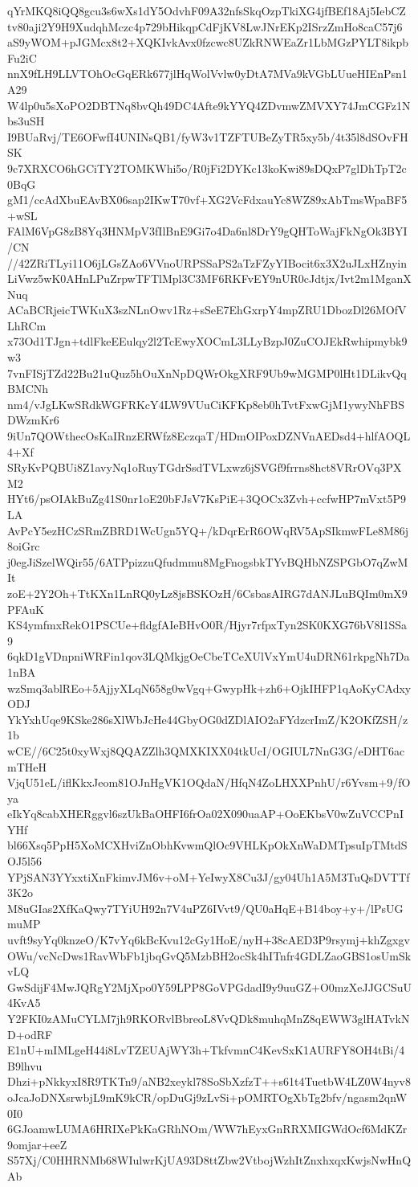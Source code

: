 qYrMKQ8iQQ8gcu3s6wXs1dY5OdvhF09A32nfsSkqOzpTkiXG4jfBEf18Aj5IebCZ
tv80aji2Y9H9XudqhMczc4p729bHikqpCdFjKV8LwJNrEKp2ISrzZmHo8caC57j6
aS9yWOM+pJGMcx8t2+XQKIvkAvx0fzcwc8UZkRNWEaZr1LbMGzPYLT8ikpbFu2iC
nnX9fLH9LLVTOhOcGqERk677jlHqWolVvlw0yDtA7MVa9kVGbLUueHIEnPsn1A29
W4lp0u5sXoPO2DBTNq8bvQh49DC4Afte9kYYQ4ZDvmwZMVXY74JmCGFz1Nbs3uSH
I9BUaRvj/TE6OFwfI4UNINsQB1/fyW3v1TZFTUBeZyTR5xy5b/4t35l8dSOvFHSK
9c7XRXCO6hGCiTY2TOMKWhi5o/R0jFi2DYKc13koKwi89sDQxP7glDhTpT2c0BqG
gM1/ccAdXbuEAvBX06sap2IKwT70vf+XG2VcFdxauYc8WZ89xAbTmsWpaBF5+wSL
FAlM6VpG8zB8Yq3HNMpV3fIlBnE9Gi7o4Da6nl8DrY9gQHToWajFkNgOk3BYI/CN
//42ZRiTLyi11O6jLGsZAo6VVnoURPSSaPS2aTzFZyYIBocit6x3X2uJLxHZnyin
LiVwz5wK0AHnLPuZrpwTFTlMpl3C3MF6RKFvEY9nUR0cJdtjx/Ivt2m1MganXNuq
ACaBCRjeicTWKuX3szNLnOwv1Rz+sSeE7EhGxrpY4mpZRU1DbozDl26MOfVLhRCm
x73Od1TJgn+tdlFkeEEulqy2l2TcEwyXOCmL3LLyBzpJ0ZuCOJEkRwhipmybk9w3
7vnFISjTZd22Bu21uQuz5hOuXnNpDQWrOkgXRF9Ub9wMGMP0lHt1DLikvQqBMCNh
nm4/vJgLKwSRdkWGFRKcY4LW9VUuCiKFKp8eb0hTvtFxwGjM1ywyNhFBSDWzmKr6
9iUn7QOWthecOsKaIRnzERWfz8EczqaT/HDmOIPoxDZNVnAEDsd4+hlfAOQL4+Xf
SRyKvPQBUi8Z1avyNq1oRuyTGdrSsdTVLxwz6jSVGf9frrns8hct8VRrOVq3PXM2
HYt6/psOIAkBuZg41S0nr1oE20bFJsV7KsPiE+3QOCx3Zvh+ccfwHP7mVxt5P9LA
AvPcY5ezHCzSRmZBRD1WcUgn5YQ+/kDqrErR6OWqRV5ApSIkmwFLe8M86j8oiGrc
j0egJiSzelWQir55/6ATPpizzuQfudmmu8MgFnogsbkTYvBQHbNZSPGbO7qZwMIt
zoE+2Y2Oh+TtKXn1LnRQ0yLz8jsBSKOzH/6CsbasAIRG7dANJLuBQIm0mX9PFAuK
KS4ymfmxRekO1PSCUe+fldgfAIeBHvO0R/Hjyr7rfpxTyn2SK0KXG76bV8l1SSa9
6qkD1gVDnpniWRFin1qov3LQMkjgOeCbeTCeXUlVxYmU4uDRN61rkpgNh7Da1nBA
wzSmq3ablREo+5AjjyXLqN658g0wVgq+GwypHk+zh6+OjkIHFP1qAoKyCAdxyODJ
YkYxhUqe9KSke286sXlWbJcHe44GbyOG0dZDlAIO2aFYdzcrImZ/K2OKfZSH/z1b
wCE//6C25t0xyWxj8QQAZZlh3QMXKIXX04tkUcI/OGIUL7NnG3G/eDHT6acmTHeH
VjqU51eL/iflKkxJeom81OJnHgVK1OQdaN/HfqN4ZoLHXXPnhU/r6Yvsm+9/fOya
eIkYq8cabXHERggvl6szUkBaOHFI6frOa02X090uaAP+OoEKbsV0wZuVCCPnIYHf
bl66Xsq5PpH5XoMCXHviZnObhKvwmQlOc9VHLKpOkXnWaDMTpsuIpTMtdSOJ5l56
YPjSAN3YYxxtiXnFkimvJM6v+oM+YeIwyX8Cu3J/gy04Uh1A5M3TuQsDVTTf3K2o
M8uGIas2XfKaQwy7TYiUH92n7V4uPZ6IVvt9/QU0aHqE+B14boy+y+/lPsUGmuMP
uvft9syYq0knzeO/K7vYq6kBcKvu12cGy1HoE/nyH+38cAED3P9rsymj+khZgxgv
OWu/vcNcDws1RavWbFb1jbqGvQ5MzbBH2ocSk4hITnfr4GDLZaoGBS1osUmSkvLQ
GwSdijF4MwJQRgY2MjXpo0Y59LPP8GoVPGdadI9y9uuGZ+O0mzXeJJGCSuU4KvA5
Y2FKI0zAMuCYLM7jh9RKORvlBbreoL8VvQDk8muhqMnZ8qEWW3glHATvkND+odRF
E1nU+mIMLgeH44i8LvTZEUAjWY3h+TkfvmnC4KevSxK1AURFY8OH4tBi/4B9lhvu
Dhzi+pNkkyxI8R9TKTn9/aNB2xeykl78SoSbXzfzT++s61t4TuetbW4LZ0W4nyv8
oJcaJoDNXsrwbjL9mK9kCR/opDuGj9zLvSi+pOMRTOgXbTg2bfv/ngasm2qnW0I0
6GJoamwLUMA6HRIXePkKaGRhNOm/WW7hEyxGnRRXMIGWdOcf6MdKZr9omjar+eeZ
S57Xj/C0HHRNMb68WIulwrKjUA93D8ttZbw2VtbojWzhItZnxhxqxKwjsNwHnQAb
